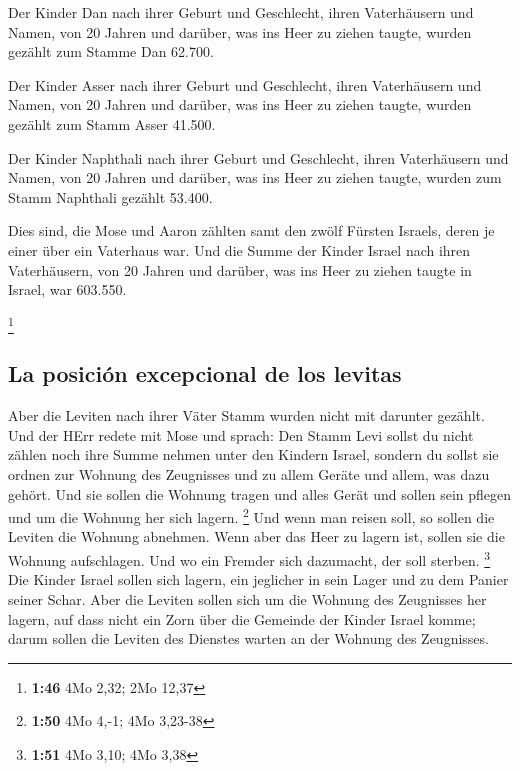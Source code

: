  Der Kinder Dan nach ihrer Geburt und Geschlecht, ihren
Vaterhäusern und Namen, von 20 Jahren und darüber, was ins Heer zu
ziehen taugte,  wurden gezählt zum Stamme Dan 62.700.

 Der Kinder Asser nach ihrer Geburt und Geschlecht, ihren
Vaterhäusern und Namen, von 20 Jahren und darüber, was ins Heer zu
ziehen taugte,  wurden gezählt zum Stamm Asser 41.500.

 Der Kinder Naphthali nach ihrer Geburt und Geschlecht,
ihren Vaterhäusern und Namen, von 20 Jahren und darüber, was ins Heer zu
ziehen taugte,  wurden zum Stamm Naphthali gezählt
53.400.

 Dies sind, die Mose und Aaron zählten samt den zwölf
Fürsten Israels, deren je einer über ein Vaterhaus war. 
Und die Summe der Kinder Israel nach ihren Vaterhäusern, von 20 Jahren
und darüber, was ins Heer zu ziehen taugte in Israel, 
war 603.550.

\footnote{\textbf{1:46} 4Mo 2,32; 2Mo 12,37}

\hypertarget{la-posiciuxf3n-excepcional-de-los-levitas}{%
\subsection{La posición excepcional de los
levitas}\label{la-posiciuxf3n-excepcional-de-los-levitas}}

 Aber die Leviten nach ihrer Väter Stamm wurden nicht mit
darunter gezählt.  Und der HErr redete mit Mose und
sprach:  Den Stamm Levi sollst du nicht zählen noch ihre
Summe nehmen unter den Kindern Israel,  sondern du sollst
sie ordnen zur Wohnung des Zeugnisses und zu allem Geräte und allem, was
dazu gehört. Und sie sollen die Wohnung tragen und alles Gerät und
sollen sein pflegen und um die Wohnung her sich lagern. \footnote{\textbf{1:50}
  4Mo 4,-1; 4Mo 3,23-38}  Und wenn man reisen soll, so
sollen die Leviten die Wohnung abnehmen. Wenn aber das Heer zu lagern
ist, sollen sie die Wohnung aufschlagen. Und wo ein Fremder sich
dazumacht, der soll sterben. \footnote{\textbf{1:51} 4Mo 3,10; 4Mo 3,38}
 Die Kinder Israel sollen sich lagern, ein jeglicher in
sein Lager und zu dem Panier seiner Schar.  Aber die
Leviten sollen sich um die Wohnung des Zeugnisses her lagern, auf dass
nicht ein Zorn über die Gemeinde der Kinder Israel komme; darum sollen
die Leviten des Dienstes warten an der Wohnung des Zeugnisses.

